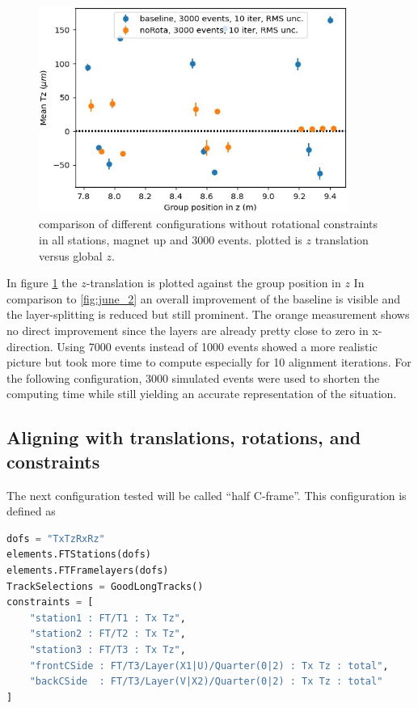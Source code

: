 \begin{figure}
  \centering
  \includegraphics[width=0.9\textwidth]{plots/renewed_plots/lxplus/4_4.jpeg}
  \caption{comparison of different configurations without rotational constraints in all stations, magnet up and 3000 events. plotted is $z$ translation versus global $z$.}
  \label{fig:june_2_1}
\end{figure}

In figure \ref{fig:june_2_1} the $z$-translation is plotted against the group position in $z$ In comparison to \ref{fig:june_2} an overall improvement of the baseline is visible and the layer-splitting is reduced but still prominent. The orange measurement shows no direct improvement since the layers are already pretty close to zero in x-direction.
Using 7000 events instead of 1000 events showed a more realistic picture but
took more time to compute especially for 10 alignment iterations.
For the following configuration, 3000 simulated events were used to shorten the computing time while still yielding an accurate representation of the situation.

\subsection{Aligning with translations, rotations, and constraints}
The next configuration tested will be called ``half C-frame''. This configuration is defined as

\begin{lstlisting}[language=Python, basicstyle=\footnotesize]
dofs = "TxTzRxRz"
elements.FTStations(dofs)
elements.FTFramelayers(dofs)
TrackSelections = GoodLongTracks()
constraints = [
    "station1 : FT/T1 : Tx Tz",
    "station2 : FT/T2 : Tx Tz",
    "station3 : FT/T3 : Tx Tz",
    "frontCSide : FT/T3/Layer(X1|U)/Quarter(0|2) : Tx Tz : total",
    "backCSide  : FT/T3/Layer(V|X2)/Quarter(0|2) : Tx Tz : total"
]
\end{lstlisting}

